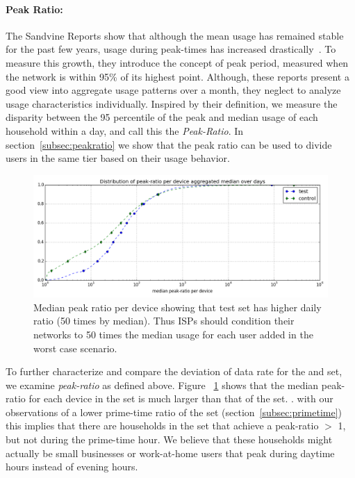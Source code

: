\paragraph{Peak Ratio: }The Sandvine Reports show that although the mean usage has remained
stable for the past few years, usage during peak-times has increased
drastically~\cite{sandvine20141h}. To measure this growth, they introduce the
concept of peak period, measured when the network is within 95\% of its highest point.
Although, these reports present a good view into aggregate usage patterns over a month,
they neglect to analyze usage characteristics individually. Inspired by their
definition, we measure the disparity between the 95 percentile of the peak and 
median
usage of each household within a day, and call this the \emph{Peak-Ratio}. In
section~\ref{subsec:peakratio} we show that the peak ratio can be used
to divide users in the same tier based on their usage behavior.



\begin{figure}[ht]
\begin{minipage}{0.90\linewidth}
\centering
\includegraphics[width=1\linewidth]{figures/peakratio-CDF-devices-MEDIAN.png}
\caption{Median peak ratio per device showing that test set has higher daily ratio (50 times by median). Thus ISPs should condition their networks to 50 times the median usage for each user added in the worst case scenario.}
\label{fig:CDF-peak-ratio-median}
\end{minipage}
\end{figure}

To further characterize and compare the deviation of data rate for the \control and \test set, we examine \emph{peak-ratio} as defined above. 
Figure ~\ref{fig:CDF-peak-ratio-median} shows that the median peak-ratio for each device in the \test set is much larger than that of the \control set.
.
 with our observations of a lower prime-time ratio of the \test set (section~\ref{subsec:primetime}) this implies that there are households in the \test set that achieve a peak-ratio $>$ 1, but not during the prime-time hour. We believe that these households might actually be small businesses or work-at-home users that peak during daytime hours instead of evening hours.

